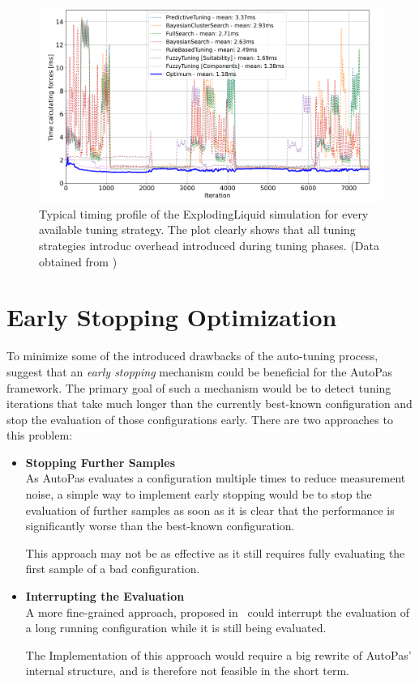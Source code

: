 \documentclass[conference]{IEEEtran}
\begin{document}
\begin{figure}[h]
    \centering
    \includegraphics[width=\columnwidth]{figures/unnecessary-tuning-phases.png}
    \caption{
        Typical timing profile of the ExplodingLiquid simulation for every available tuning strategy. The plot clearly shows that all tuning strategies introduc overhead introduced during tuning phases. (Data obtained from \cite{lerchner2024})
    }
    \label{fig:unnecessary-tuning-phases}
\end{figure}

\section{Early Stopping Optimization}

To minimize some of the introduced drawbacks of the auto-tuning process, \cite{endreport.pdf}\cite{Manuel_Lerchner_Thesis.pdf}\cite{autopas_issue673} suggest that an \textit{early stopping} mechanism could be beneficial for the AutoPas framework. The primary goal of such a mechanism would be to detect tuning iterations that take much longer than the currently best-known configuration and stop the evaluation of those configurations early. There are two approaches to this problem:


\begin{itemize}
    \item \textbf{Stopping Further Samples}\\
          As AutoPas evaluates a configuration multiple times to reduce measurement noise, a simple way to implement early stopping would be to stop the evaluation of further samples as soon as it is clear that the performance is significantly worse than the best-known configuration.

          This approach may not be as effective as it still requires fully evaluating the first sample of a bad configuration.
    \item \textbf{Interrupting the Evaluation}\\
          A more fine-grained approach, proposed in~\cite{endreport.pdf} could interrupt the evaluation of a long running configuration while it is still being evaluated.

          The Implementation of this approach would require a big rewrite of AutoPas' internal structure, and is therefore not feasible in the short term.
\end{itemize}
\end{document}
